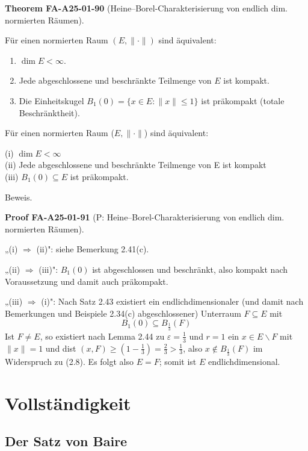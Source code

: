 \documentclass[10pt, letterpaper]{article}
\newcommand{\CustomHeading}[3]{%
  \par\medskip\noindent%
  \textbf{#1 #2} \textnormal{(#3)}.\enskip%
}
\newenvironment{THEO}[2]{\begin{unitbox}\CustomHeading{Theorem}{#1}{#2}}{\end{unitbox}}
\newenvironment{PROOF}[2]{\begin{unitbox}\CustomHeading{Proof}{#1}{#2}}{\end{unitbox}}
\begin{document}
\begin{THEO}{FA-A25-01-90}{Heine--Borel-Charakterisierung von endlich dim. normierten Räumen}
Für einen normierten Raum $(E,\|\cdot\|)$ sind äquivalent:
\begin{enumerate}
\item[(i)] $\dim E<\infty$.
\item[(ii)] Jede abgeschlossene und beschränkte Teilmenge von $E$ ist kompakt.
\item[(iii)] Die Einheitskugel $B_1(0)=\{x\in E:\|x\|\le 1\}$ ist präkompakt (totale Beschränktheit).
\end{enumerate}
\end{THEO}


Für einen normierten Raum ($E,\|\cdot\|$) sind äquivalent:

(i) $\operatorname{dim} E<\infty$\\
(ii) Jede abgeschlossene und beschränkte Teilmenge von E ist kompakt\\
(iii) $B_{1}(0) \subseteq E$ ist präkompakt.

Beweis. 

\begin{PROOF}{FA-A25-01-91}{P: Heine--Borel-Charakterisierung von endlich dim. normierten Räumen}
„(i) $\Longrightarrow$ (ii)": siehe Bemerkung 2.41(c).

„(ii) $\Longrightarrow$ (iii)": $B_{1}(0)$ ist abgeschlossen und beschränkt, also kompakt nach Voraussetzung und damit auch präkompakt.

„(iii) $\Longrightarrow$ (i)": Nach Satz 2.43 existiert ein endlichdimensionaler (und damit nach Bemerkungen und Beispiele 2.34(c) abgeschlossener) Unterraum $F \subseteq E$ mit
$$
B_{1}(0) \subseteq B_{\frac{1}{3}}(F)
$$
Ist $F \neq E$, so existiert nach Lemma 2.44 zu $\varepsilon=\frac{1}{3}$ und $r=1$ ein $x \in E \backslash F$ mit $\|x\|=1$ und dist $(x, F) \geq\left(1-\frac{1}{3}\right)=\frac{2}{3}>\frac{1}{3}$, also $x \notin B_{\frac{1}{3}}(F)$ im Widerspruch zu (2.8). Es folgt also $E=F$; somit ist $E$ endlichdimensional.
\end{PROOF}




\pagebreak

\section{Vollständigkeit}

\subsection{Der Satz von Baire}
\end{document}
